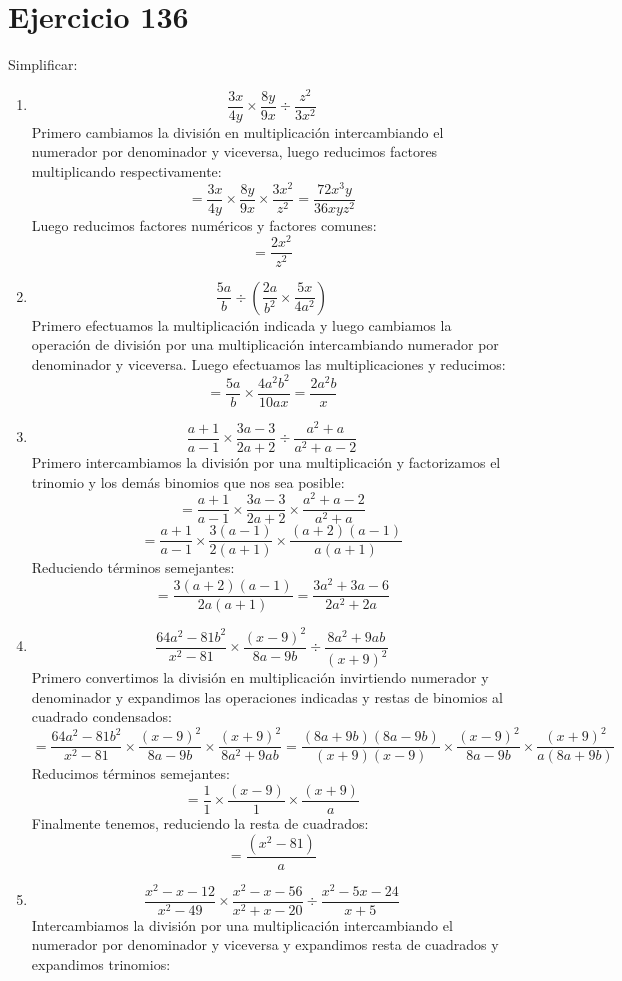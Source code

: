 \documentclass[12pt]{article}
\begin{document}
\section*{Ejercicio 136}
Simplificar:
\begin{enumerate}[label=\bfseries Ejercicio \arabic*:]
  \item $$\frac{3x}{4y} \times \frac{8y}{9x} \div \frac{z^2}{3x^2}$$
Primero cambiamos la división en multiplicación intercambiando el numerador por denominador y viceversa, luego reducimos factores multiplicando respectivamente:
$$= \frac{3x}{4y} \times \frac{8y}{9x} \times \frac{3x^2}{z^2} = \frac{72 x^3y}{36xyz^2}$$
Luego reducimos factores numéricos y factores comunes:
$$= \frac{2x^2}{z^2}$$
  \item $$\frac{5a}{b} \div \left( \frac{2a}{b^2} \times \frac{5x}{4a^2} \right)$$
Primero efectuamos la multiplicación indicada y luego cambiamos la operación de división por una multiplicación intercambiando numerador por denominador y viceversa. Luego efectuamos las multiplicaciones y reducimos:
$$= \frac{5a}{b} \times \frac{4a^2b^2}{10ax} = \frac{2a^2b}{x}$$
  \item $$\frac{a+1}{a-1} \times \frac{3a - 3}{2a + 2} \div \frac{a^2 + a}{a^2 + a - 2}$$
Primero intercambiamos la división por una multiplicación y factorizamos el trinomio y los demás binomios que nos sea posible:
$$= \frac{a+1}{a-1} \times \frac{3a - 3}{2a + 2} \times \frac{a^2 + a - 2}{a^2 + a}$$
$$= \frac{a+1}{a-1} \times \frac{3(a - 1)}{2(a + 1)} \times \frac{(a + 2)(a - 1)}{a (a + 1)}$$
Reduciendo términos semejantes:
$$= \frac{3(a + 2)(a - 1)}{2a(a + 1)} = \frac{3a^2 + 3a - 6}{2a^2 + 2a}$$
  \item $$\frac{64a^2 - 81b^2}{x^2 - 81} \times \frac{(x - 9)^2}{8a - 9b} \div \frac{8a^2 + 9ab}{(x + 9)^2}$$
Primero convertimos la división en multiplicación invirtiendo numerador y denominador y expandimos las operaciones indicadas y restas de binomios al cuadrado condensados:
$$= \frac{64a^2 - 81b^2}{x^2 - 81} \times \frac{(x - 9)^2}{8a - 9b} \times \frac{(x + 9)^2}{8a^2 + 9ab} = \frac{(8a + 9b)(8a - 9b)}{(x + 9)(x - 9)} \times \frac{(x-9)^2}{8a - 9b} \times \frac{(x + 9)^2}{a(8a + 9b)}$$
Reducimos términos semejantes:
$$= \frac{1}{1} \times \frac{(x - 9)}{1} \times \frac{(x + 9)}{a}$$
Finalmente tenemos, reduciendo la resta de cuadrados:
$$= \frac{(x^2 - 81)}{a}$$
  \item $$\frac{x^2 - x - 12}{x^2 - 49} \times \frac{x^2 - x - 56}{x^2 + x - 20} \div \frac{x^2 - 5x - 24}{x + 5}$$
Intercambiamos la división por una multiplicación intercambiando el numerador por denominador y viceversa y expandimos resta de cuadrados y expandimos trinomios:

\end{enumerate}
\end{document}

